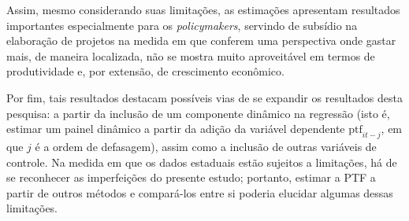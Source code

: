 \documentclass[
  12pt,
  a4paper,
  oneside,
  brazil,
  chapter=TITLE,
  section=TITLE
]{abntex2}
\begin{document}
Assim, mesmo considerando suas limitações, as estimações apresentam resultados importantes especialmente para os \textit{policymakers}, servindo de subsídio na elaboração de projetos na medida em que conferem uma perspectiva onde gastar mais, de maneira localizada, não se mostra muito aproveitável em termos de produtividade e, por extensão, de crescimento econômico.

Por fim, tais resultados destacam possíveis vias de se expandir os resultados desta pesquisa: a partir da inclusão de um componente dinâmico na regressão (isto é, estimar um painel dinâmico a partir da adição da variável dependente $\text{ptf}_{it-j}$, em que $j$ é a ordem de defasagem), assim como a inclusão de outras variáveis de controle. Na medida em que os dados estaduais estão sujeitos a limitações, há de se reconhecer as imperfeições do presente estudo; portanto, estimar a PTF a partir de outros métodos e compará-los entre si poderia elucidar algumas dessas limitações.

\postextual


\end{document}
